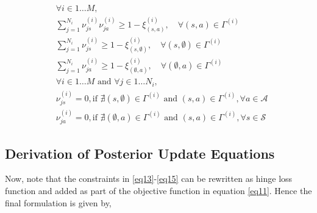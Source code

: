 \documentclass[runningheads]{llncs}
\begin{document}
\begin{align}
&\forall i \in 1\dots M, \nonumber\\
& \sum_{j=1}^{N_i} \nu_{js}^{(i)} \nu_{ja}^{(i)} \geq 1 - \xi_{(s,a)}^{(i)}, \quad \forall (s,a)\in \Gamma^{(i)} \label{eq13}\\[-0.5em]
& \sum_{j=1}^{N_i} \nu_{js}^{(i)} \geq 1 - \xi_{(s,\emptyset)}^{(i)}, \quad \forall (s,\emptyset)\in \Gamma^{(i)} \label{eq14}\\[-0.5em]
& \sum_{j=1}^{N_i}  \nu_{ja}^{(i)} \geq 1 - \xi_{(\emptyset,a)}^{(i)}, \quad \forall (\emptyset,a)\in \Gamma^{(i)} \label{eq15}\\[-0.5em]
&\forall i \in 1\dots M \mbox{ and }\forall j \in 1\dots N_i, \nonumber\\
& \nu_{js}^{(i)} = 0, \text{if } \nexists (s,\emptyset)\in\Gamma^{(i)} \mbox{ and } (s,a) \in \Gamma^{(i)}, \forall a \in \mathcal{A} \label{eq16}\\[-0.3em]
& \nu_{ja}^{(i)} = 0, \text{if } \nexists (\emptyset,a)\in\Gamma^{(i)} \mbox{ and } (s,a) \in \Gamma^{(i)},  \forall s \in \mathcal{S} \label{eq17}
\end{align}\subsection{Derivation of Posterior Update Equations}
Now, note that the constraints in \eqref{eq13}-\eqref{eq15} can be rewritten as hinge loss function and added as part of the objective function in equation \eqref{eq11}.  Hence the final formulation is given by,
\end{document}
